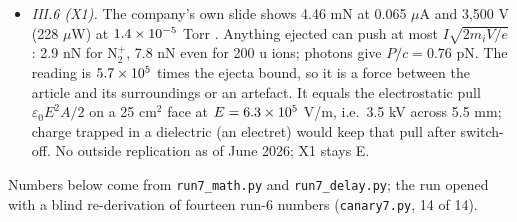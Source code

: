\begin{itemize}
itself, whose coupling vanishes at the symmetric position. A dedicated superconducting loop pair couples at that position; I.23 shows it
holds the unstable axis.
\item \emph{III.6 (X1).} The company's own slide shows 4.46 mN at 0.065 $\mu$A and 3{,}500 V (228 $\mu$W) at $1.4\times10^{-5}$ Torr \cite{exodusslides}.
Anything ejected can push at most $I\sqrt{2m_iV/e}$: 2.9 nN for N$_2^+$, 7.8 nN even for 200 u ions; photons give $P/c=0.76$ pN. The reading is
$5.7\times10^{5}$ times the ejecta bound, so it is a force between the article and its surroundings or an artefact. It equals the electrostatic pull
$\varepsilon_0E^2A/2$ on a 25 cm$^2$ face at $E=6.3\times10^{5}$ V/m, i.e.\ 3.5 kV across 5.5 mm; charge trapped in a dielectric (an electret) would
keep that pull after switch-off. No outside replication as of June 2026; X1 stays E.
\end{itemize}
Numbers below come from \texttt{run7\_math.py} and \texttt{run7\_delay.py}; the run opened with a blind re-derivation of fourteen run-6 numbers
(\texttt{canary7.py}, 14 of 14).

\setcounter{section}{1}\setcounter{subsection}{21}
